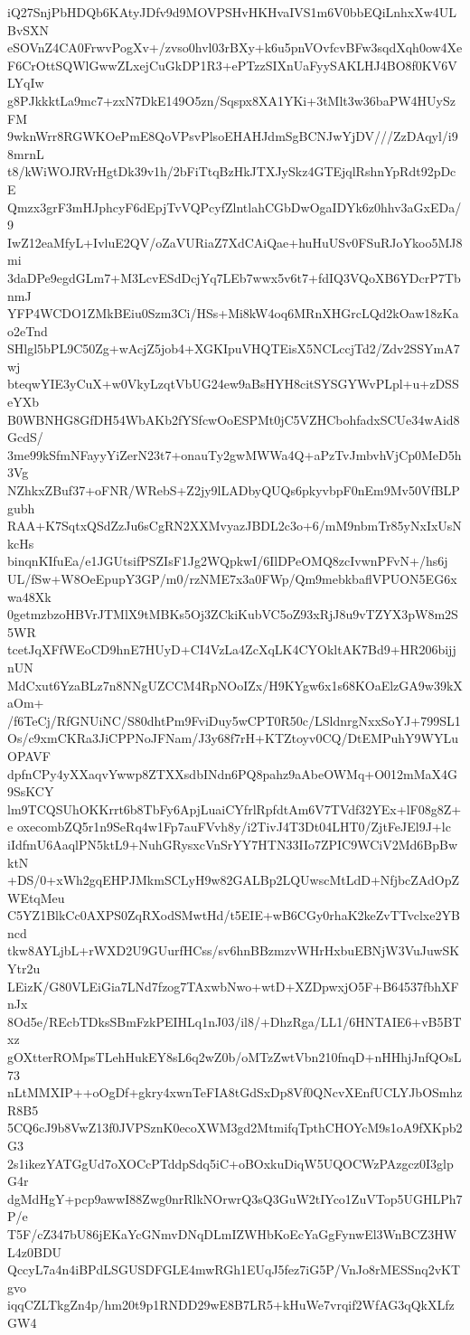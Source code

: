 iQ27SnjPbHDQb6KAtyJDfv9d9MOVPSHvHKHvaIVS1m6V0bbEQiLnhxXw4ULBvSXN
eSOVnZ4CA0FrwvPogXv+/zvso0hvl03rBXy+k6u5pnVOvfcvBFw3sqdXqh0ow4Xe
F6CrOttSQWlGwwZLxejCuGkDP1R3+ePTzzSIXnUaFyySAKLHJ4BO8f0KV6VLYqIw
g8PJkkktLa9mc7+zxN7DkE149O5zn/Sqspx8XA1YKi+3tMlt3w36baPW4HUySzFM
9wknWrr8RGWKOePmE8QoVPsvPlsoEHAHJdmSgBCNJwYjDV///ZzDAqyl/i98mrnL
t8/kWiWOJRVrHgtDk39v1h/2bFiTtqBzHkJTXJySkz4GTEjqlRshnYpRdt92pDcE
Qmzx3grF3mHJphcyF6dEpjTvVQPcyfZlntlahCGbDwOgaIDYk6z0hhv3aGxEDa/9
IwZ12eaMfyL+IvluE2QV/oZaVURiaZ7XdCAiQae+huHuUSv0FSuRJoYkoo5MJ8mi
3daDPe9egdGLm7+M3LcvESdDcjYq7LEb7wwx5v6t7+fdIQ3VQoXB6YDcrP7TbnmJ
YFP4WCDO1ZMkBEiu0Szm3Ci/HSs+Mi8kW4oq6MRnXHGrcLQd2kOaw18zKao2eTnd
SHlgl5bPL9C50Zg+wAcjZ5job4+XGKIpuVHQTEisX5NCLccjTd2/Zdv2SSYmA7wj
bteqwYIE3yCuX+w0VkyLzqtVbUG24ew9aBsHYH8citSYSGYWvPLpl+u+zDSSeYXb
B0WBNHG8GfDH54WbAKb2fYSfcwOoESPMt0jC5VZHCbohfadxSCUe34wAid8GcdS/
3me99kSfmNFayyYiZerN23t7+onauTy2gwMWWa4Q+aPzTvJmbvhVjCp0MeD5h3Vg
NZhkxZBuf37+oFNR/WRebS+Z2jy9lLADbyQUQs6pkyvbpF0nEm9Mv50VfBLPgubh
RAA+K7SqtxQSdZzJu6sCgRN2XXMvyazJBDL2c3o+6/mM9nbmTr85yNxIxUsNkcHs
binqnKIfuEa/e1JGUtsifPSZIsF1Jg2WQpkwI/6IlDPeOMQ8zcIvwnPFvN+/hs6j
UL/fSw+W8OeEpupY3GP/m0/rzNME7x3a0FWp/Qm9mebkbaflVPUON5EG6xwa48Xk
0getmzbzoHBVrJTMlX9tMBKs5Oj3ZCkiKubVC5oZ93xRjJ8u9vTZYX3pW8m2S5WR
tcetJqXFfWEoCD9hnE7HUyD+CI4VzLa4ZcXqLK4CYOkltAK7Bd9+HR206bijjnUN
MdCxut6YzaBLz7n8NNgUZCCM4RpNOoIZx/H9KYgw6x1s68KOaElzGA9w39kXaOm+
/f6TeCj/RfGNUiNC/S80dhtPm9FviDuy5wCPT0R50c/LSldnrgNxxSoYJ+799SL1
Os/c9xmCKRa3JiCPPNoJFNam/J3y68f7rH+KTZtoyv0CQ/DtEMPuhY9WYLuOPAVF
dpfnCPy4yXXaqvYwwp8ZTXXsdbINdn6PQ8pahz9aAbeOWMq+O012mMaX4G9SsKCY
lm9TCQSUhOKKrrt6b8TbFy6ApjLuaiCYfrlRpfdtAm6V7TVdf32YEx+lF08g8Z+e
oxecombZQ5r1n9SeRq4w1Fp7auFVvh8y/i2TivJ4T3Dt04LHT0/ZjtFeJEl9J+lc
iIdfmU6AaqlPN5ktL9+NuhGRysxcVnSrYY7HTN33IIo7ZPIC9WCiV2Md6BpBwktN
+DS/0+xWh2gqEHPJMkmSCLyH9w82GALBp2LQUwscMtLdD+NfjbcZAdOpZWEtqMeu
C5YZ1BlkCc0AXPS0ZqRXodSMwtHd/t5EIE+wB6CGy0rhaK2keZvTTvclxe2YBncd
tkw8AYLjbL+rWXD2U9GUurfHCss/sv6hnBBzmzvWHrHxbuEBNjW3VuJuwSKYtr2u
LEizK/G80VLEiGia7LNd7fzog7TAxwbNwo+wtD+XZDpwxjO5F+B64537fbhXFnJx
8Od5e/REcbTDksSBmFzkPEIHLq1nJ03/il8/+DhzRga/LL1/6HNTAIE6+vB5BTxz
gOXtterROMpsTLehHukEY8sL6q2wZ0b/oMTzZwtVbn210fnqD+nHHhjJnfQOsL73
nLtMMXIP++oOgDf+gkry4xwnTeFIA8tGdSxDp8Vf0QNcvXEnfUCLYJbOSmhzR8B5
5CQ6cJ9b8VwZ13f0JVPSznK0ecoXWM3gd2MtmifqTpthCHOYcM9s1oA9fXKpb2G3
2s1ikezYATGgUd7oXOCcPTddpSdq5iC+oBOxkuDiqW5UQOCWzPAzgcz0I3glpG4r
dgMdHgY+pcp9awwI88Zwg0nrRlkNOrwrQ3sQ3GuW2tIYco1ZuVTop5UGHLPh7P/e
T5F/cZ347bU86jEKaYcGNmvDNqDLmIZWHbKoEcYaGgFynwEl3WnBCZ3HWL4z0BDU
QccyL7a4n4iBPdLSGUSDFGLE4mwRGh1EUqJ5fez7iG5P/VnJo8rMESSnq2vKTgvo
iqqCZLTkgZn4p/hm20t9p1RNDD29wE8B7LR5+kHuWe7vrqif2WfAG3qQkXLfzGW4
